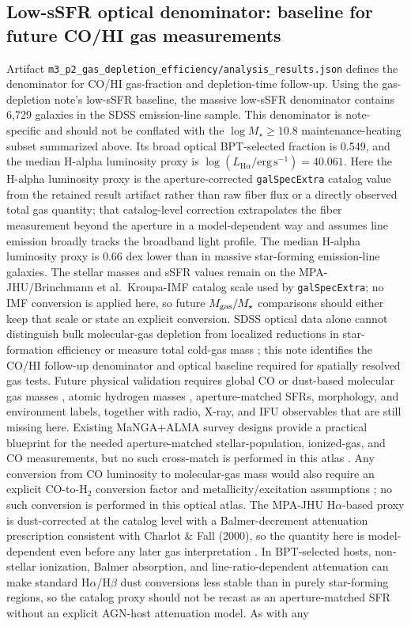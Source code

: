 \documentclass[twocolumn]{aastex631}
\begin{document}
\subsection{Low-sSFR optical denominator: baseline for future CO/HI gas measurements}
Artifact \texttt{m3\_p2\_gas\_depletion\_efficiency/analysis\_results.json} defines the denominator for CO/HI gas-fraction and depletion-time follow-up. Using the gas-depletion note's low-sSFR baseline, the massive low-sSFR denominator contains 6,729 galaxies in the SDSS emission-line sample. This denominator is note-specific and should not be conflated with the \(\log M_\star \geq 10.8\) maintenance-heating subset summarized above. Its broad optical BPT-selected fraction is 0.549, and the median H-alpha luminosity proxy is \(\log (L_{\mathrm{H}\alpha}/\mathrm{erg\,s^{-1}}) = 40.061\). Here the H-alpha luminosity proxy is the aperture-corrected \texttt{galSpecExtra} catalog value from the retained result artifact rather than raw fiber flux or a directly observed total gas quantity; that catalog-level correction extrapolates the fiber measurement beyond the aperture in a model-dependent way and assumes line emission broadly tracks the broadband light profile. The median H-alpha luminosity proxy is 0.66 dex lower than in massive star-forming emission-line galaxies. The stellar masses and sSFR values remain on the MPA-JHU/Brinchmann et al.\ Kroupa-IMF catalog scale used by \texttt{galSpecExtra}; no IMF conversion is applied here, so future \(M_{\rm gas}/M_\star\) comparisons should either keep that scale or state an explicit conversion. SDSS optical data alone cannot distinguish bulk molecular-gas depletion from localized reductions in star-formation efficiency or measure total cold-gas mass \citep{tacconi2018}; this note identifies the CO/HI follow-up denominator and optical baseline required for spatially resolved gas tests. Future physical validation requires global CO or dust-based molecular gas masses \citep[e.g., xCOLD GASS;][]{xcoldgass2017}, atomic hydrogen masses \citep[e.g., xGASS;][]{xgass2018}, aperture-matched SFRs, morphology, and environment labels, together with radio, X-ray, and IFU observables that are still missing here. Existing MaNGA+ALMA survey designs provide a practical blueprint for the needed aperture-matched stellar-population, ionized-gas, and CO measurements, but no such cross-match is performed in this atlas \citep{lin2020}. Any conversion from CO luminosity to molecular-gas mass would also require an explicit CO-to-H$_2$ conversion factor and metallicity/excitation assumptions \citep{bolatto2013,sandstrom2013}; no such conversion is performed in this optical atlas. The MPA-JHU H$\alpha$-based proxy is dust-corrected at the catalog level with a Balmer-decrement attenuation prescription consistent with Charlot \& Fall (2000), so the quantity here is model-dependent even before any later gas interpretation \citep{charlotfall2000}. In BPT-selected hosts, non-stellar ionization, Balmer absorption, and line-ratio-dependent attenuation can make standard H$\alpha$/H$\beta$ dust conversions less stable than in purely star-forming regions, so the catalog proxy should not be recast as an aperture-matched SFR without an explicit AGN-host attenuation model. As with any 
\end{document}
